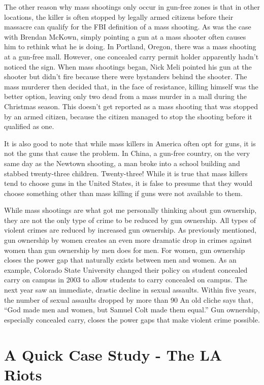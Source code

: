 The other reason why mass shootings only occur in gun-free zones is that
in other locations, the killer is often stopped by legally armed
citizens before their massacre can qualify for the FBI definition of a
mass shooting.  As was the case with Brendan McKown, simply pointing a
gun at a mass shooter often causes him to rethink what he is doing. In
Portland, Oregon, there was a mass shooting at a gun-free mall.
However, one concealed carry permit holder apparently hadn’t noticed
the sign. When mass shootings began, Nick Meli pointed his gun at the
shooter but didn’t fire because there were bystanders behind the
shooter. The mass murderer then decided that, in the face of
resistance, killing himself was the better option, leaving only two
dead from a mass murder in a mall during the Christmas season.  This
doesn't get reported as a mass shooting that was
stopped by an armed citizen, because the citizen managed to stop the
shooting before it qualified as one.

It is also good to note that while mass killers in America often opt for
guns, it is not the guns that cause the problem. In China, a gun-free
country, on the very same day as the Newtown shooting, a man broke into
a school building and stabbed twenty-three children. Twenty-three! 
While it is true that mass killers tend to choose guns in the United
States, it is false to presume that they would choose something other
than mass killing if guns were not available to them.

While mass shootings are what got me personally thinking about gun
ownership, they are not the only type of crime to be reduced by gun
ownership. All types of violent crimes are reduced by increased gun
ownership. As
previously mentioned, gun ownership by women creates an even more
dramatic drop in crimes against women than gun ownership by men does
for men. For women,
gun ownership closes the power gap that naturally exists between men
and women.  
As an example, Colorado State University changed their policy on student concealed 
carry on campus in 2003 to allow students to carry concealed on campus.  The next year saw an immediate, drastic decline
in sexual assaults.  Within five years, the number of sexual assaults
dropped by more than 90%
An old cliche says that, “God made men and women, but
Samuel Colt made them equal.”  Gun ownership, especially concealed
carry, closes the power gaps that make violent crime possible.  

\section{A Quick Case Study - The LA Riots}

